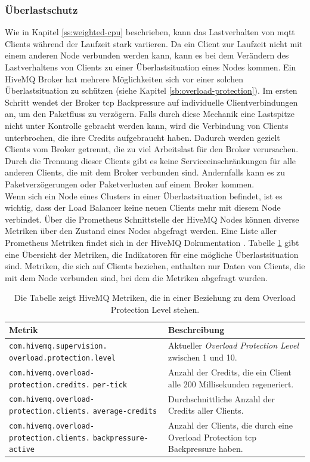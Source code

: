\subsubsection{Überlastschutz} \label{ss:circuit-breaking}
Wie in Kapitel \ref{ss:weighted-cpu} beschrieben, kann das Lastverhalten von \ac{mqtt} Clients während der Laufzeit stark variieren. Da ein Client zur Laufzeit nicht mit einem anderen Node verbunden werden kann, kann es bei dem Verändern des Lastverhaltens von Clients zu einer Überlastsituation eines Nodes kommen.
Ein HiveMQ Broker hat mehrere Möglichkeiten sich vor einer solchen Überlastsituation zu schützen (siehe Kapitel \ref{sb:overload-protection}).
Im ersten Schritt wendet der Broker \ac{tcp} Backpressure auf individuelle Clientverbindungen an, um den Paketfluss zu verzögern.
Falls durch diese Mechanik eine Lastspitze nicht unter Kontrolle gebracht werden kann, wird die Verbindung von Clients unterbrochen, die ihre Credits aufgebraucht haben.
Dadurch werden gezielt Clients vom Broker getrennt, die zu viel Arbeitslast für den Broker verursachen.
Durch die Trennung dieser Clients gibt es keine Serviceeinschränkungen für alle anderen Clients, die mit dem Broker verbunden sind. Andernfalls kann es zu Paketverzögerungen oder Paketverlusten auf einem Broker kommen.
\\
Wenn sich ein Node eines Clusters in einer Überlastsituation befindet, ist es wichtig, dass der Load Balancer keine neuen Clients mehr mit diesem Node verbindet.
Über die Prometheus Schnittstelle der HiveMQ Nodes können diverse Metriken über den Zustand eines Nodes abgefragt werden.
Eine Liste aller Prometheus Metriken findet sich in der HiveMQ Dokumentation \cite{MonitoringHiveMQDocumentation}.
Tabelle \ref{table:overload-protection-metrics} gibt eine Übersicht der Metriken, die Indikatoren für eine mögliche Überlastsituation sind. Metriken, die sich auf Clients beziehen, enthalten nur Daten von Clients, die mit dem Node verbunden sind, bei dem die Metriken abgefragt wurden.
\begin{table}[htbp]
\centering
\renewcommand{\arraystretch}{1.5}
\begin{tabularx}{\textwidth}{|p{5cm}|X|}
    \hline
    \textbf{Metrik} & \textbf{Beschreibung} \\
    \hline
    \hline
    \verb|com.hivemq.supervision.| \verb|overload.protection.level| & Aktueller \textit{Overload Protection Level} zwischen 1 und 10. \\
    \hline
    \verb|com.hivemq.overload-| \verb|protection.credits.| \verb|per-tick| & Anzahl der Credits, die ein Client alle 200 Millisekunden regeneriert. \\
    \hline
    \verb|com.hivemq.overload-| \verb|protection.clients.| \verb|average-credits| & Durchschnittliche Anzahl der Credits aller Clients. \\
    \hline
    \verb|com.hivemq.overload-| \verb|protection.clients.| \verb|backpressure-active| & Anzahl der Clients, die durch eine Overload Protection \ac{tcp} Backpressure haben. \\
    \hline
\end{tabularx}
\caption{Die Tabelle zeigt HiveMQ Metriken, die in einer Beziehung zu dem Overload Protection Level stehen.}
\label{table:overload-protection-metrics}
\end{table}
